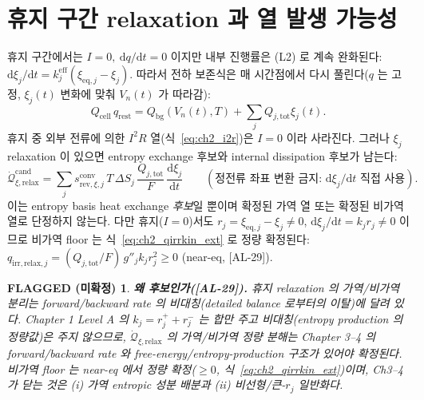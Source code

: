 \documentclass[11pt,a4paper]{article}
\newtheorem*{flagbox}{FLAGGED (미확정)}
\newcommand{\dd}{\mathrm{d}}
\newcommand{\eff}{\mathrm{eff}}
\newcommand{\eq}{\mathrm{eq}}
\newcommand{\bg}{\mathrm{bg}}
\newcommand{\cell}{\mathrm{cell}}
\newcommand{\tot}{\mathrm{tot}}
\newcommand{\irr}{\mathrm{irr}}
\newcommand{\rev}{\mathrm{rev}}
\newcommand{\rlx}{\mathrm{relax}}
\newcommand{\cand}{\mathrm{cand}}
\newcommand{\conv}{\mathrm{conv}}
\newcommand{\AL}[1]{\textsf{[AL-#1]}}
\begin{document}
\section{휴지 구간 relaxation 과 열 발생 가능성}\label{sec:ch2_rest}
휴지 구간에서는 $I=0,\ \dd q/\dd t=0$ 이지만 내부 진행률은 (L2) 로 계속 완화된다:
$\dd\xi_j/\dd t=k_j^{\eff}(\xi_{\eq,j}-\xi_j)$. 따라서 전하 보존식은 매 시간점에서 다시 풀린다($q$ 는 고정,
$\xi_j(t)$ 변화에 맞춰 $V_n(t)$ 가 따라감):
\begin{equation}
Q_\cell\,q_{\mathrm{rest}}=Q_\bg(V_n(t),T)+\sum_jQ_{j,\tot}\xi_j(t).
\label{eq:ch2_rest_balance}
\end{equation}
휴지 중 외부 전류에 의한 $I^2R$ 열(식~\eqref{eq:ch2_i2r})은 $I=0$ 이라 사라진다. 그러나 $\xi_j$ relaxation 이
있으면 entropy exchange 후보와 internal dissipation 후보가 남는다:
\begin{equation}
\dot{\mathcal Q}_{\xi,\rlx}^{\cand}=\sum_j s_{\rev,\xi,j}^{\conv}\,T\,\Delta S_j\,\frac{Q_{j,\tot}}{F}\,\frac{\dd\xi_j}{\dd t}
\qquad(\text{정전류 좌표 변환 금지: } \dd\xi_j/\dd t \text{ 직접 사용}).
\label{eq:ch2_relax}
\end{equation}
이는 entropy basis heat exchange \emph{후보}일 뿐이며 확정된 가역 열 또는 확정된 비가역 열로 단정하지 않는다.
다만 휴지($I=0$)서도 $r_j=\xi_{\eq,j}-\xi_j\ne0$, $\dd\xi_j/\dd t=k_j r_j\ne0$ 이므로 비가역 floor 는 식~\eqref{eq:ch2_qirrkin_ext}
로 정량 확정된다: $q_{\irr,\rlx,j}=(Q_{j,\tot}/F)\,g''_j k_j r_j^2\ge0$ (near-eq, \AL{29}).
\begin{flagbox}
\textbf{왜 후보인가(\AL{29}).} 휴지 relaxation 의 가역/비가역 분리는 forward/backward rate 의 비대칭(detailed
balance 로부터의 이탈)에 달려 있다. Chapter 1 Level A 의 $k_j=r_j^++r_j^-$ 는 \emph{합}만 주고 비대칭(entropy
production 의 정량값)은 주지 않으므로, $\dot{\mathcal Q}_{\xi,\rlx}$ 의 가역/비가역 \emph{정량} 분해는 Chapter
3--4 의 forward/backward rate 와 free-energy/entropy-production 구조가 있어야 확정된다. 비가역 floor 는 near-eq
에서 정량 확정($\ge0$, 식~\eqref{eq:ch2_qirrkin_ext})이며, Ch3--4 가 닫는 것은 (i) 가역 entropic 성분 배분과
(ii) 비선형/큰-$r_j$ 일반화다.
\end{flagbox}

\end{document}
